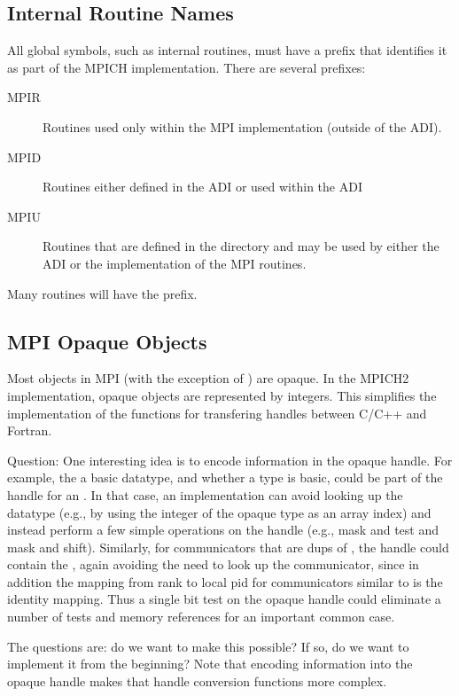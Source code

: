 \documentclass{article}
\begin{document}
\subsection{Internal Routine Names}
\label{sec:routine-names}
All global symbols, such as internal routines, must have a prefix that
identifies it as part of the MPICH implementation.  There are several
prefixes:
\begin{description}
\item[MPIR]Routines used only within the MPI implementation (outside of the
  ADI).
\item[MPID]Routines either defined in the ADI or used within the ADI
\item[MPIU]Routines that are defined in the  directory and
may be used by either the ADI or the implementation of the MPI
routines.
\end{description}
Many routines will have the  prefix.

\subsection{MPI Opaque Objects}
\label{sec:mpi-opaque}
Most objects in MPI (with the exception of ) are
opaque.  In the MPICH2 implementation, opaque objects are represented
by integers.  This simplifies the implementation of the functions for
transfering handles between C/C++ and Fortran.  

Question:  One interesting idea is to encode information in the opaque
handle.  For example, the  a basic datatype, and whether
a type is basic, could be part of the handle for an
. In that case, an implementation can avoid looking
up the datatype (e.g., by using the integer of the opaque type as an
array index) and instead perform a few simple operations on the handle
(e.g., mask and test and mask and shift).  Similarly, for
communicators that are dups of , the handle could
contain the , again avoiding the need to look up the
communicator, since in addition the mapping from rank to local pid for 
communicators similar to  is the identity
mapping.  Thus a single bit test on the opaque handle could eliminate
a number of tests and memory references for an important common case.

The questions are: do we want to make this possible?  If so, do we
want to implement it from the beginning?  Note that encoding
information into the opaque handle makes that handle conversion
functions more complex.
\end{document}
